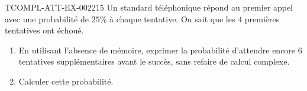 \begin{exercice}{TCOMPL-ATT-EX-002}{2}{15}
Un standard téléphonique répond au premier appel avec une probabilité de $25\%$ à chaque tentative. On sait que les $4$ premières tentatives ont échoué.
\begin{enumerate}
  \item En utilisant l'absence de mémoire, exprimer la probabilité d'attendre encore $6$ tentatives supplémentaires avant le succès, sans refaire de calcul complexe.
  \item Calculer cette probabilité.
\end{enumerate}
\end{exercice}
